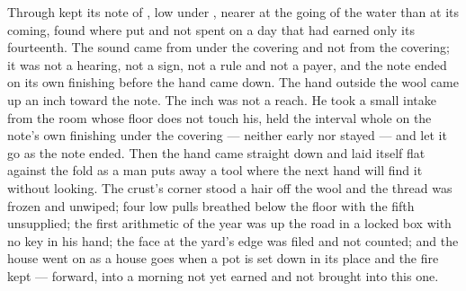 Through   kept its note of , low under , nearer at the going of the water than at its coming, found where put and not spent on a day that had earned only its fourteenth. The sound came from under the covering and not from the covering; it was not a hearing, not a sign, not a rule and not a payer, and the note ended on its own finishing before the hand came down. The hand outside the wool came up an inch toward the note. The inch was not a reach. He took a small intake from the room whose floor does not touch his, held the interval whole on the note's own finishing under the covering --- neither early nor stayed --- and let it go as the note ended. Then the hand came straight down and laid itself flat against the fold as a man puts away a tool where the next hand will find it without looking. The crust's corner stood a hair off the wool and the thread was frozen and unwiped; four low pulls breathed below the floor with the fifth unsupplied; the first arithmetic of the year was up the road in a locked box with no key in his hand; the face at the yard's edge was filed and not counted; and the house went on as a house goes when a pot is set down in its place and the fire kept --- forward, into a morning not yet earned and not brought into this one.
